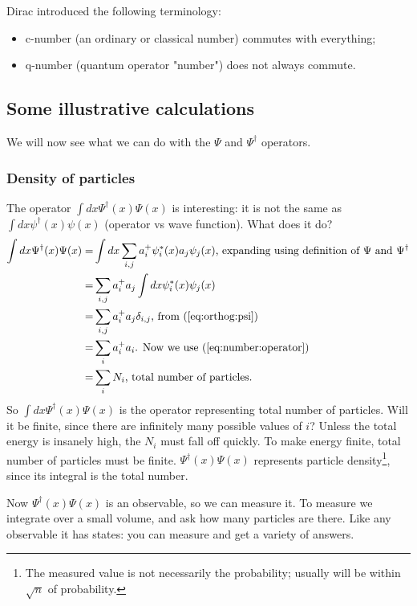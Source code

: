 \documentclass[]{article}
\begin{document}
Dirac introduced the following terminology:
\begin{itemize}
	\item c-number (an ordinary or classical number) commutes with everything;
	\item q-number (quantum operator "number") does not always commute.
\end{itemize}

\subsection{Some illustrative calculations}
We will now see what we can do with the  $\Psi$ and  $\Psi^\dagger$ operators.

\subsubsection{Density of particles}

The operator $\int dx \Psi^\dagger(x) \Psi(x)$ is interesting: it is not the same as $\int dx \psi^\dagger(x) \psi(x)$ (operator vs wave function). What does it do?
\begin{align*}
	\int dx \Psi^\dagger(x) \Psi(x)=&\int dx \sum_{i,j}a^+_i\psi_i^*(x) a_j\psi_j(x) \text{, expanding using definition of $\Psi$ and $\Psi^\dagger$}\\
	=&\sum_{i,j} a^+_i a_j \int dx \psi_i^*(x) \psi_j(x)\\
	=&\sum_{i,j} a^+_i a_j \delta_{i,j} \text{, from (\ref{eq:orthog:psi})}\\
	=&\sum_i a^+_i a_i \text{. Now we use (\ref{eq:number:operator})}\\
	=&\sum_i N_i \text{, total number of particles.}
\end{align*}
So $\int dx \Psi^\dagger(x) \Psi(x)$ is the operator representing total number of particles. Will it be finite, since there are infinitely many possible values of $i$? Unless the total energy is insanely high, the $N_i$ must fall off quickly. To make energy finite, total number of particles must be finite. $\Psi^\dagger(x) \Psi(x)$ represents particle density\footnote{The measured value is not necessarily the probability; usually will be within $\sqrt{n}$ of probability.}, since its integral is the total number.

Now  $\Psi^\dagger(x) \Psi(x)$ is an observable, so we can measure it.  To measure we integrate over a small volume, and ask how many particles are there. Like any observable it has states: you can measure and get a variety of answers.
\end{document}
